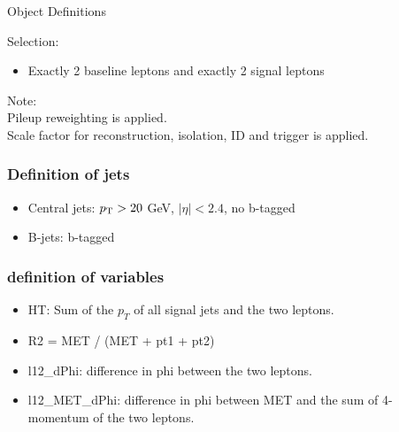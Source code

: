\documentclass[mathserif,serif]{beamer}
\begin{document}
\begin{frame}{Object Definitions}
\raggedright
Selection:
\begin{itemize}
\item Exactly 2 baseline leptons and exactly 2 signal leptons
\end{itemize}

\tiny
Note: \\
Pileup reweighting is applied. \\
Scale factor for reconstruction, isolation, ID and trigger is applied.
\end{frame}

\begin{frame}
\frametitle{Definition of jets}
\normalsize
\begin{itemize}
\item Central jets: $p_{\text{T}}>20$ GeV, $|\eta|<2.4$, no b-tagged
\item B-jets: b-tagged
\end{itemize}
\end{frame}

\begin{frame}
\frametitle{definition of variables}
\normalsize
\begin{itemize}
\item HT: Sum of the $p_T$ of all signal jets and the two leptons.
\item R2 = MET / (MET + pt1 + pt2)
\item l12\_dPhi: difference in phi between the two leptons.
\item l12\_MET\_dPhi: difference in phi between MET and the sum of 4-momentum of the two leptons.
\end{itemize}
\end{frame}

%
%
\end{document}
